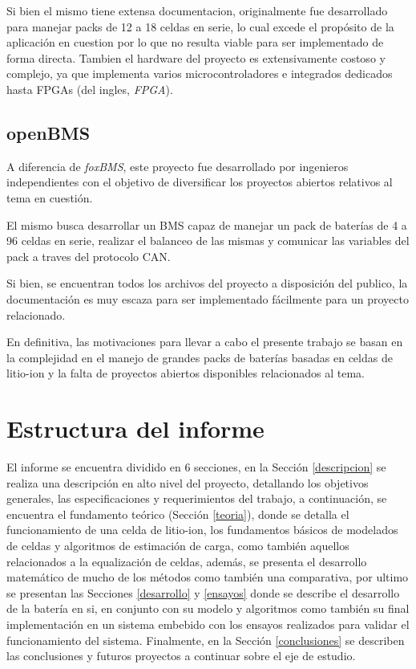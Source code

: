 \documentclass[10pt, a4paper]{report}
\begin{document}
\noindent Si bien el mismo tiene extensa documentacion, originalmente fue
desarrollado para manejar packs de 12 a 18 celdas en serie, lo cual excede el
prop\'osito de la aplicaci\'on en cuestion por lo que no resulta viable para ser
implementado de forma directa. Tambien el hardware del proyecto es
extensivamente costoso y complejo, ya que implementa varios microcontroladores e
integrados dedicados hasta \acrshort{FPGA}s (del ingles, \emph{\acrlong{FPGA}}).

\subsection{openBMS}

A diferencia de \emph{foxBMS}, este proyecto fue desarrollado por ingenieros
independientes con el objetivo de diversificar los proyectos abiertos relativos
al tema en cuesti\'on.

\noindent El mismo busca desarrollar un \acrshort{BMS} capaz de manejar un
pack de bater\'ias de 4 a 96 celdas en serie, realizar el balanceo de las mismas 
y comunicar las variables del pack a traves del protocolo \acrshort{CAN}.

\noindent Si bien, se encuentran todos los archivos del proyecto a disposición
del publico, la documentaci\'on es muy escaza para ser implementado
f\'acilmente para un proyecto relacionado.

\noindent En definitiva, las motivaciones para llevar a cabo el presente trabajo
se basan en la complejidad en el manejo de grandes packs de
bater\'ias basadas en celdas de litio-ion y la falta de proyectos abiertos
disponibles relacionados al tema.

\section{Estructura del informe}

El informe se encuentra dividido en 6 secciones, en la Sección \ref{descripcion}
se realiza una descripci\'on en alto nivel del proyecto, detallando los
objetivos generales, las especificaciones y requerimientos del trabajo, a
continuaci\'on, se encuentra el fundamento te\'orico (Secci\'on \ref{teoria}),
donde se detalla el funcionamiento de una celda de litio-ion, los fundamentos
b\'asicos de modelados de celdas y algoritmos de estimaci\'on de carga, como
tambi\'en aquellos relacionados a la equalizaci\'on de celdas, adem\'as, se
presenta el desarrollo matem\'atico de mucho de los m\'etodos como tambi\'en una
comparativa, por ultimo se presentan las Secciones \ref{desarrollo} y
\ref{ensayos} donde se describe el desarrollo de la bater\'ia en si, en conjunto
con su modelo y algoritmos como tambi\'en su final implementaci\'on en un
sistema embebido con los ensayos realizados para validar el funcionamiento del
sistema. Finalmente, en la Secci\'on \ref{conclusiones} se describen las
conclusiones y futuros proyectos a continuar sobre el eje de estudio.
\end{document}
